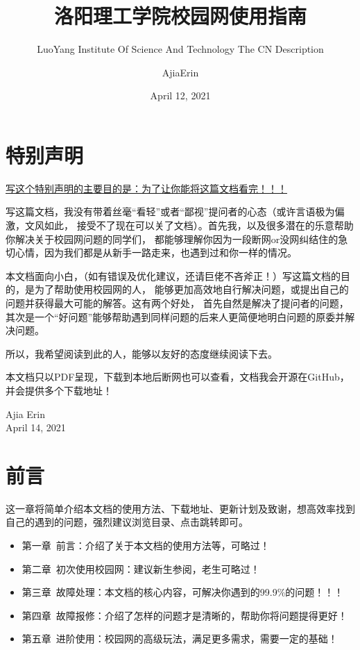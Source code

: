 \documentclass[lang=cn,11pt,chinese,base=hide]{elegantbook}
\title{洛阳理工学院校园网使用指南}
\subtitle{LuoYang Institute Of Science And Technology The CN Description}
\institute{Ajia Network Technology Studio}
\date{April 12, 2021}
\author{AjiaErin}
\begin{document}
\maketitle
\frontmatter

\chapter*{特别声明}

\begin{center}
\underline{写这个特别声明的主要目的是：为了让你能将这篇文档看完！！！}
\end{center}

写这篇文档，我没有带着丝毫“看轻”或者“鄙视”提问者的心态（或许言语极为偏激，文风如此，
接受不了现在可以关了文档）。首先我，以及很多潜在的乐意帮助你解决关于校园网问题的同学们，
都能够理解你因为一段断网or没网纠结住的急切心情，因为我们都是从新手一路走来，也遇到过和你一样的情况。

本文档面向小白，（如有错误及优化建议，还请巨佬不吝斧正！）写这篇文档的目的，是为了帮助使用校园网的人，
能够更加高效地自行解决问题，或提出自己的问题并获得最大可能的解答。这有两个好处，
首先自然是解决了提问者的问题，其次是一个“好问题”能够帮助遇到同样问题的后来人更简便地明白问题的原委并解决问题。

所以，我希望阅读到此的人，能够以友好的态度继续阅读下去。

本文档只以PDF呈现，下载到本地后断网也可以查看，文档我会开源在GitHub，并会提供多个下载地址！


\vskip 1.5cm

\begin{flushright}
Ajia Erin\\
April 14, 2021
\end{flushright}

\tableofcontents

\mainmatter
\chapter{前言}
这一章将简单介绍本文档的使用方法、下载地址、更新计划及致谢，想高效率找到自己的遇到的问题，强烈建议浏览目录、点击跳转即可。\\
\begin{itemize}
  \item 第一章~前言：介绍了关于本文档的使用方法等，可略过！
  \item 第二章~初次使用校园网：建议新生参阅，老生可略过！
  \item 第三章~故障处理：本文档的核心内容，可解决你遇到的99.9\%的问题！！！
  \item 第四章~故障报修：介绍了怎样的问题才是清晰的，帮助你将问题提得更好！
  \item 第五章~进阶使用：校园网的高级玩法，满足更多需求，需要一定的基础！
\end{itemize}
\end{document}

